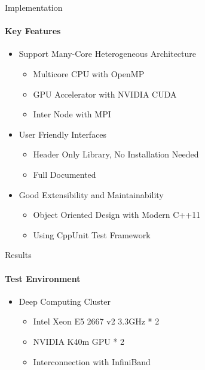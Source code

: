 \documentclass[final]{beamer}
\newlength{\onecolwid}
\begin{document}
\begin{frame}[t]
\begin{columns}[t]
\begin{column}{\onecolwid}
\begin{block}{Implementation}
          \paragraph{\textbf{Key Features}}
            \begin{itemize}
              \item Support Many-Core Heterogeneous Architecture
                \begin{itemize}
                  \item Multicore CPU with OpenMP
                  \item GPU Accelerator with NVIDIA CUDA
                  \item Inter Node with MPI
                \end{itemize}
              \item User Friendly Interfaces
              \begin{itemize}
                \item Header Only Library, No Installation Needed
                \item Full Documented
              \end{itemize}
              \item Good Extensibility and Maintainability
              \begin{itemize}
                \item Object Oriented Design with Modern C++11
                \item Using CppUnit Test Framework
              \end{itemize}
            \end{itemize}
        \end{block}

        \begin{block}{Results}
          
          \paragraph{\textbf{Test Environment}}
          \begin{itemize}
            \item Deep Computing Cluster
            \begin{itemize}
              \item Intel Xeon E5 2667 v2 3.3GHz * 2
              \item NVIDIA K40m GPU * 2
              \item Interconnection with InfiniBand
            \end{itemize}
          \end{itemize}


\end{block}
\end{column}
\end{columns}
\end{frame}
\end{document}
